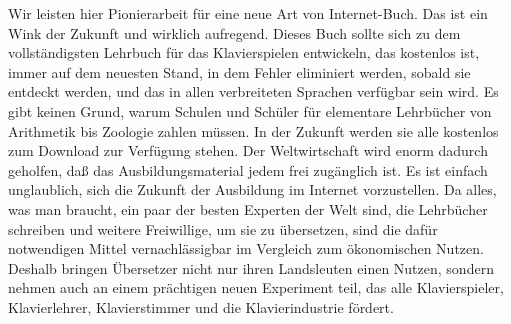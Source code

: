 Wir leisten hier Pionierarbeit für eine neue Art von Internet-Buch. Das ist ein Wink der Zukunft und wirklich aufregend.
Dieses Buch sollte sich zu dem vollständigsten Lehrbuch für das Klavierspielen entwickeln, das kostenlos ist, immer auf dem neuesten Stand, in dem Fehler eliminiert werden, sobald sie entdeckt werden, und das in allen verbreiteten Sprachen verfügbar sein wird.
Es gibt keinen Grund, warum Schulen und Schüler für elementare Lehrbücher von Arithmetik bis Zoologie zahlen müssen.
In der Zukunft werden sie alle kostenlos zum Download zur Verfügung stehen.
Der Weltwirtschaft wird enorm dadurch geholfen, daß das Ausbildungsmaterial jedem frei zugänglich ist.
Es ist einfach unglaublich, sich die Zukunft der Ausbildung im Internet vorzustellen.
Da alles, was man braucht, ein paar der besten Experten der Welt sind, die Lehrbücher schreiben und weitere Freiwillige, um sie zu übersetzen, sind die dafür notwendigen Mittel vernachlässigbar im Vergleich zum ökonomischen Nutzen.
Deshalb bringen Übersetzer nicht nur ihren Landsleuten einen Nutzen, sondern nehmen auch an einem prächtigen neuen Experiment teil, das alle Klavierspieler, Klavierlehrer, Klavierstimmer und die Klavierindustrie fördert.





